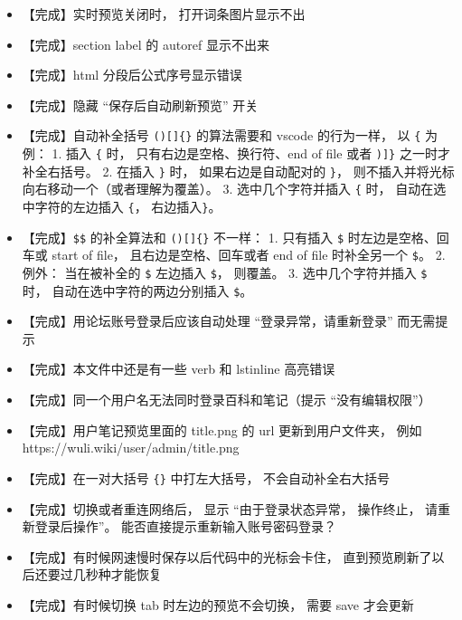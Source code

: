 \begin{itemize}
\item 【完成】实时预览关闭时， 打开词条图片显示不出

\item 【完成】section label 的 autoref 显示不出来

\item 【完成】html 分段后公式序号显示错误

\item 【完成】隐藏 “保存后自动刷新预览” 开关

\item 【完成】自动补全括号 \verb|()[]{}| 的算法需要和 vscode 的行为一样， 以 \verb|{| 为例： 1. 插入 \verb|{| 时， 只有右边是空格、换行符、end of file 或者 \verb|)]}| 之一时才补全右括号。 2.  在插入 \verb|}| 时， 如果右边是自动配对的 \verb|}|， 则不插入并将光标向右移动一个（或者理解为覆盖）。 3. 选中几个字符并插入 \verb|{| 时， 自动在选中字符的左边插入 \verb|{|， 右边插入\verb|}|。

\item 【完成】\verb|$$| 的补全算法和 \verb|()[]{}| 不一样： 1. 只有插入 \verb|$| 时左边是空格、回车或 start of file， 且右边是空格、回车或者 end of file 时补全另一个 \verb|$|。 2. 例外： 当在被补全的 \verb|$| 左边插入 \verb|$|， 则覆盖。 3. 选中几个字符并插入 \verb|$| 时， 自动在选中字符的两边分别插入 \verb|$|。

\item 【完成】用论坛账号登录后应该自动处理 “登录异常，请重新登录” 而无需提示

\item 【完成】本文件中还是有一些 verb 和 lstinline 高亮错误

\item 【完成】同一个用户名无法同时登录百科和笔记（提示 “没有编辑权限”）

\item 【完成】用户笔记预览里面的 title.png 的 url 更新到用户文件夹， 例如 https://wuli.wiki/user/admin/title.png

\item 【完成】在一对大括号 \verb|{}| 中打左大括号， 不会自动补全右大括号

\item 【完成】切换或者重连网络后， 显示 “由于登录状态异常， 操作终止， 请重新登录后操作”。 能否直接提示重新输入账号密码登录？

\item 【完成】有时候网速慢时保存以后代码中的光标会卡住， 直到预览刷新了以后还要过几秒种才能恢复

\item 【完成】有时候切换 tab 时左边的预览不会切换， 需要 save 才会更新


\end{itemize}
